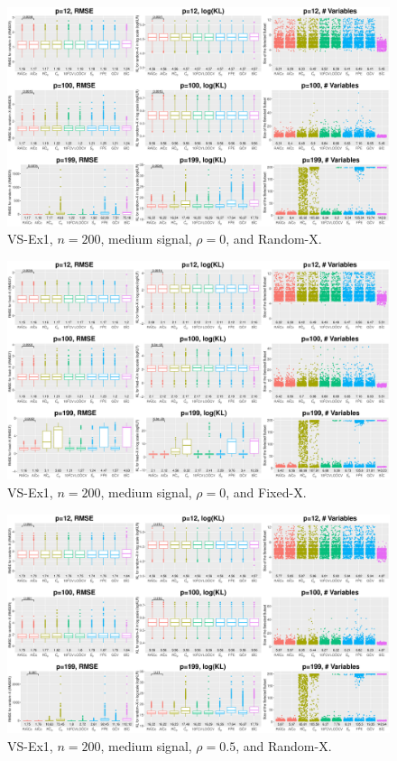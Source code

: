 \clearpage
\begin{figure}[!ht]
\centering
\includegraphics[width=\textwidth]{figures/supplement/randomx_VS-Ex1_n200_msnr_rho0.eps}
\caption{VS-Ex1, $n=200$, medium signal, $\rho=0$, and Random-X.}
\end{figure}
\begin{figure}[!ht]
\centering
\includegraphics[width=\textwidth]{figures/supplement/fixedx_VS-Ex1_n200_msnr_rho0.eps}
\caption{VS-Ex1, $n=200$, medium signal, $\rho=0$, and Fixed-X.}
\end{figure}
\clearpage
\begin{figure}[!ht]
\centering
\includegraphics[width=\textwidth]{figures/supplement/randomx_VS-Ex1_n200_msnr_rho05.eps}
\caption{VS-Ex1, $n=200$, medium signal, $\rho=0.5$, and Random-X.}
\end{figure}
